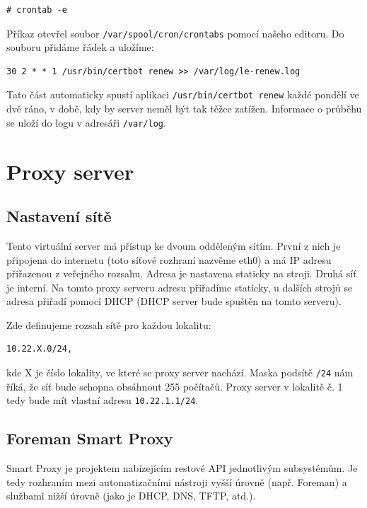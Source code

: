 \documentclass[thesis=B,czech]{FITthesis}[2012/06/26]
\begin{document}
\begin{verbatim}
# crontab -e
\end{verbatim}

Příkaz otevřel soubor \texttt{/var/spool/cron/crontabs} pomocí našeho editoru. Do souboru přidáme řádek a uložíme:

\begin{verbatim}
30 2 * * 1 /usr/bin/certbot renew >> /var/log/le-renew.log
\end{verbatim}

Tato část automaticky spustí aplikaci \texttt{/usr/bin/certbot renew} každé pondělí ve dvě ráno, v době, kdy by server neměl být tak těžce zatížen. Informace o průběhu se uloží do logu v adresáři \texttt{/var/log}. 

\section{Proxy server}
\subsection{Nastavení sítě}

Tento virtuální server má přístup ke dvoum odděleným sítím. První z nich je připojena do internetu (toto síťové rozhraní nazvěme eth0) a má IP adresu přiřazenou z veřejného rozsahu. Adresa je nastavena staticky na stroji. Druhá síť je interní. Na tomto proxy serveru adresu přiřadíme staticky, u dalších strojů se adresa přiřadí pomocí DHCP (DHCP server bude spuštěn na tomto serveru). 


Zde definujeme rozsah sítě pro každou lokalitu: 

\begin{verbatim}
10.22.X.0/24,
\end{verbatim}

kde X je číslo lokality, ve které se proxy server nachází. Maska podsítě \texttt{/24} nám říká, že síť bude schopna obsáhnout 255 počítačů. Proxy server v lokalitě č. 1 tedy bude mít vlastní adresu \texttt{10.22.1.1/24}.

\subsection{Foreman Smart Proxy}

Smart Proxy je projektem nabízejícím restové API jednotlivým subsystémům. Je tedy rozhraním mezi automatizačními nástroji vyšší úrovně (např. Foreman) a službami nižší úrovně (jako je DHCP, DNS, TFTP, atd.).
\end{document}
